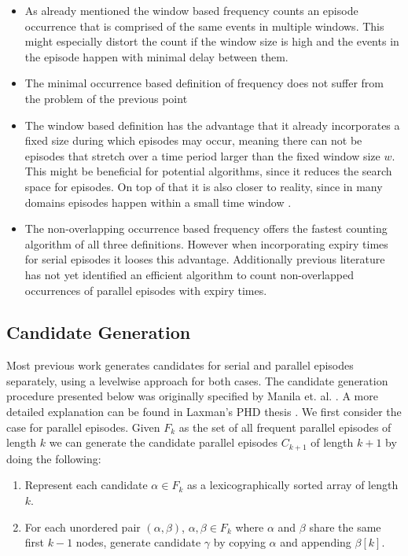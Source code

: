 \begin{itemize}
	\item As already mentioned the window based frequency counts an episode occurrence that is comprised of the same events in multiple windows. This might especially distort the count if the window size is high and the events in the episode happen with minimal delay between them.
	\item The minimal occurrence based definition of frequency does not suffer from the problem of the previous point
	\item The window based definition has the advantage that it already incorporates a fixed size during which episodes may occur, meaning there can not be episodes that stretch over a time period larger than the fixed window size $w$. This might be beneficial for potential algorithms, since it reduces the search space for episodes. On top of that it is also closer to reality, since in many domains episodes happen within a small time window \cite{generatingEpisodeDatasets}.
	\item The non-overlapping occurrence based frequency offers the fastest counting algorithm of all three definitions. However when incorporating expiry times for serial episodes it looses this advantage. Additionally previous literature has not yet identified an efficient algorithm to count non-overlapped occurrences of parallel episodes with expiry times. 
\end{itemize}

\subsection{Candidate Generation}
\label{subsec_candidateGen}
Most previous work generates candidates for serial and parallel episodes separately, using a levelwise approach for both cases. The candidate generation procedure presented below was originally specified by Manila et. al. \cite{mannila1997discovery}. A more detailed explanation can be found in Laxman's PHD thesis \cite{laxman2006discovering}. \newline
We first consider the case for parallel episodes. Given $F_k$ as the set of all frequent parallel episodes of length $k$ we can generate the candidate parallel episodes $C_{k+1}$ of length $k+1$ by doing the following:

\begin{enumerate}
	\item Represent each candidate $\alpha \in F_k$ as a lexicographically sorted array of length $k$.
	\item For each unordered pair $(\alpha , \beta )$, $\alpha ,\beta \in F_k$ where $\alpha$ and $\beta$ share the same first $k-1$ nodes, generate candidate $\gamma$ by copying $\alpha$ and appending $\beta [k]$.
\end{enumerate}


